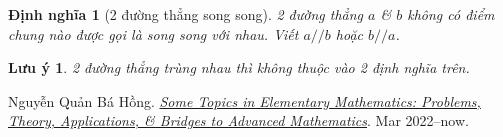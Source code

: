 \documentclass{article}
\numberwithin{equation}{section}
\newtheorem{definition}{Định nghĩa}[section]
\newtheorem{remark}{Lưu ý}[section]
\begin{document}
\begin{definition}[2 đường thẳng song song]
	2 đường thẳng $a$ \& $b$ không có điểm chung nào được gọi là \emph{song song với nhau}. Viết $a//b$ hoặc $b//a$.
\end{definition}

\begin{remark}
	2 đường thẳng \emph{trùng nhau} thì không thuộc vào 2 định nghĩa trên.
\end{remark}

\begin{thebibliography}{99}
	 Nguyễn Quản Bá Hồng. \href{https://github.com/NQBH/hobby/blob/master/elementary_math/NQBH_elementary_math.pdf}{\textit{Some Topics in Elementary Mathematics: Problems, Theory, Applications, \& Bridges to Advanced Mathematics}}. Mar 2022--now.
\end{thebibliography}


\printbibliography[heading=bibintoc]
	
\end{document}
